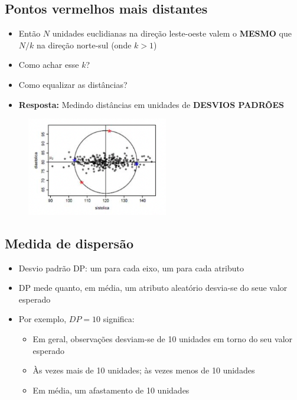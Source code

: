 \documentclass[
  letterpaper,
  DIV=11,
  numbers=noendperiod]{scrartcl}
\providecommand{\tightlist}{%
  \setlength{\itemsep}{0pt}\setlength{\parskip}{0pt}}\usepackage{longtable,booktabs,array}
\begin{document}
\hypertarget{pontos-vermelhos-mais-distantes-1}{%
\subsection{Pontos vermelhos mais
distantes}\label{pontos-vermelhos-mais-distantes-1}}

\begin{itemize}
\tightlist
\item
  Então \(N\) unidades euclidianas na direção leste-oeste valem o
  \textbf{MESMO} que \(N/k\) na direção norte-sul (onde \(k>1\))
\item
  Como achar esse \(k\)?
\item
  Como equalizar as distâncias?
\item
  \textbf{Resposta:} Medindo distâncias em unidades de \textbf{DESVIOS
  PADRÕES}
\end{itemize}

\begin{figure}

{\centering \includegraphics[width=0.55\textwidth,height=\textheight]{figs/Aula07/distancia_centro.png}

}

\end{figure}

\hypertarget{medida-de-dispersuxe3o}{%
\subsection{Medida de dispersão}\label{medida-de-dispersuxe3o}}

\begin{itemize}
\tightlist
\item
  Desvio padrão DP: um para cada eixo, um para cada atributo
\item
  DP mede quanto, em média, um atributo aleatório desvia-se do seue
  valor esperado
\item
  Por exemplo, \(DP=10\) significa:

  \begin{itemize}
  \tightlist
  \item
    Em geral, observações desviam-se de 10 unidades em torno do seu
    valor esperado
  \item
    Às vezes mais de 10 unidades; às vezes menos de 10 unidades
  \item
    Em média, um afastamento de 10 unidades
  \end{itemize}
\end{itemize}
\end{document}
